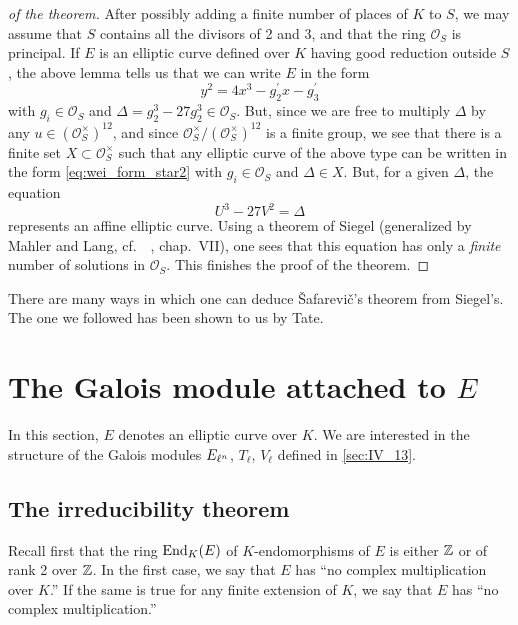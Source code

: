 \begin{proof}[ of the theorem]
After possibly adding a finite number of places of $K$ to $S$, we may assume
that $S$ contains all the divisors of 2 and 3, and that the ring
$\mathcal{O}_S$ is principal. If $E$ is an elliptic curve defined over $K$
having good reduction outside $S$, the above lemma tells us that we can write
$E$ in the form
\begin{equation}
	y^2 = 4x^3 - g_2^\prime x - g_3^\prime
	\tag{$*$}
	\label{eq:wei_form_star2}
\end{equation}
with $g_i \in \mathcal{O}_S$ and $\Delta = g_2^3 - 27 g_2^3 \in \mathcal{O}_S$.
But, since we are free to multiply $\Delta$ by any $u \in
{(\mathcal{O}_S^\times)}^{12}$, and since
$\mathcal{O}_S^\times/{(\mathcal{O}_S^\times)}^{12}$ is a finite group, we see
that there is a finite set $X \subset \mathcal{O}_S^\times$ such that any
elliptic
\dpage
curve of the above type can be written in the form \eqref{eq:wei_form_star2}
with $g_i \in \mathcal{O}_S$ and $\Delta \in X$. But, for a given $\Delta$, the
equation
\[
	U^3 - 27V^2 = \Delta
\]
represents an affine elliptic curve. Using a theorem of Siegel (generalized by
Mahler and Lang, cf.\ \citeauthor{14}~\cite{14}, chap.~VII), one sees that this
equation has only a \emph{finite} number of solutions in $\mathcal{O}_S$. This
finishes the proof of the theorem.
\end{proof}

\begin{obs}
There are many ways in which one can deduce \v Safarevi\v c's theorem from
Siegel's. The one we followed has been shown to us by Tate.
\end{obs}

\section{The Galois module attached to \texorpdfstring{$E$}{E}}
In this section, $E$ denotes an elliptic curve over $K$. We are
interested in the structure of the Galois modules ${E}_{\ell^n}$, $T_\ell$,
$V_\ell$ defined in \ref{sec:IV_13}.

\subsection{The irreducibility theorem}
\label{sec:IV_21}
Recall first that the ring $\operatorname{End}_K(E)$ of $K$-endomorphisms of $E$
is either $\mathbb{Z}$ or of rank 2 over $\mathbb{Z}$. In the first case, we say that $E$
has ``no complex multiplication over $K$.'' If the same is true for any
finite extension of $K$, we say that $E$ has ``no complex 
multiplication.''

